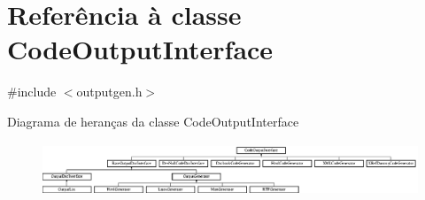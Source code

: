 \hypertarget{class_code_output_interface}{\section{Referência à classe Code\-Output\-Interface}
\label{class_code_output_interface}
}


{\ttfamily \#include $<$outputgen.\-h$>$}

Diagrama de heranças da classe Code\-Output\-Interface\begin{figure}[H]
\begin{center}
\leavevmode
\includegraphics[height=1.590909cm]{class_code_output_interface}
\end{center}
\end{figure}
